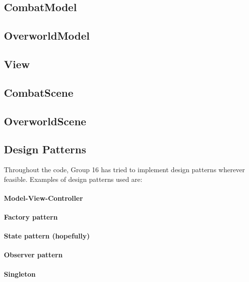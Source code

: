\subsection{CombatModel}
\label{combatmodel}

\subsection{OverworldModel}
\label{overworldmodel}

\subsection{View}
\label{view}

\subsection{CombatScene}
\label{combatscene}

\subsection{OverworldScene}
\label{overworldscene}


\subsection{Design Patterns}
Throughout the code, Group 16 has tried to implement design patterns wherever feasible. Examples of design patterns used are:
\paragraph{Model-View-Controller\\}
\paragraph{Factory pattern\\}
\paragraph{State pattern (hopefully)\\}
\paragraph{Observer pattern\\}
\paragraph{Singleton\\}

